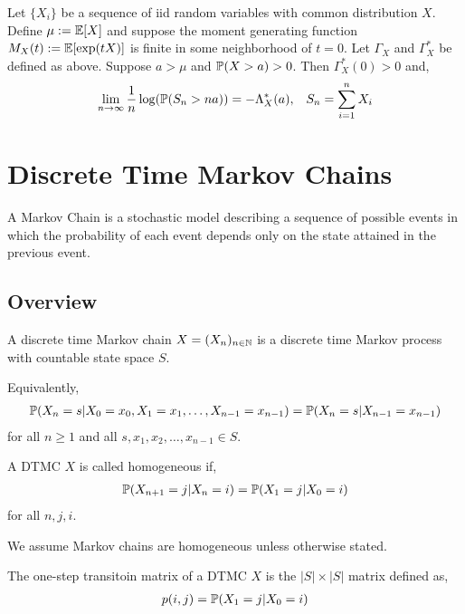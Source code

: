 \documentclass[12pt]{article}
\begin{document}
\begin{theorem}
Let \( \{X_i\} \) be a sequence of iid random variables with common distribution \(
X \). Define \( \mu := \mathbb{E}[X] \) and suppose the moment generating function \( M_X(t):= \mathbb{E}[\exp(tX)] \) is finite in some neighborhood of \( t=0 \). Let \( \Gamma_X \) and \( \Gamma_X^* \) be defined as above. Suppose \( a > \mu \) and \( \mathbb{P}(X>a)>0 \). Then \( \Gamma_X^*(0) > 0 \) and,
\begin{align*}
    \lim_{n\to\infty} \dfrac{1}{n} \log(\mathbb{P}(S_n > na)) = -\Lambda_X^*(a), && S_n = \sum_{i=1}^{n} X_i
\end{align*}
\end{theorem}

\section{Discrete Time Markov Chains}
A Markov Chain is a stochastic model describing a sequence of possible events in which the probability of each event depends only on the state attained in the previous event.

\subsection{Overview}
\begin{definition}
A discrete time Markov chain \( X = (X_n)_{n\in\mathbb{N}} \) is a discrete time Markov process with countable state space \( S \).

Equivalently,
\begin{align*}
    \mathbb{P}(X_n = s |  X_0 = x_0, X_1 = x_1, \ldots, X_{n-1} = x_{n-1}) = \mathbb{P}(X_n = s | X_{n-1} = x_{n-1})
\end{align*}
for all \( n\geq 1 \) and all \( s, x_1, x_2, \ldots, x_{n-1} \in S \).
\end{definition}

\begin{definition}
A DTMC \( X \) is called homogeneous if,
\begin{align*}
    \mathbb{P}(X_{n+1} = j | X_n = i) = \mathbb{P}(X_1 = j | X_0 = i)
\end{align*}
for all \( n, j,i \).
\end{definition}

We assume Markov chains are homogeneous unless otherwise stated.

\begin{definition}
The one-step transitoin matrix of a DTMC \( X \) is the \( |S|\times |S| \) matrix defined as,
\begin{align*}
    p(i,j) = \mathbb{P}(X_1 = j | X_0 = i)
\end{align*}
\end{definition}
\end{document}
